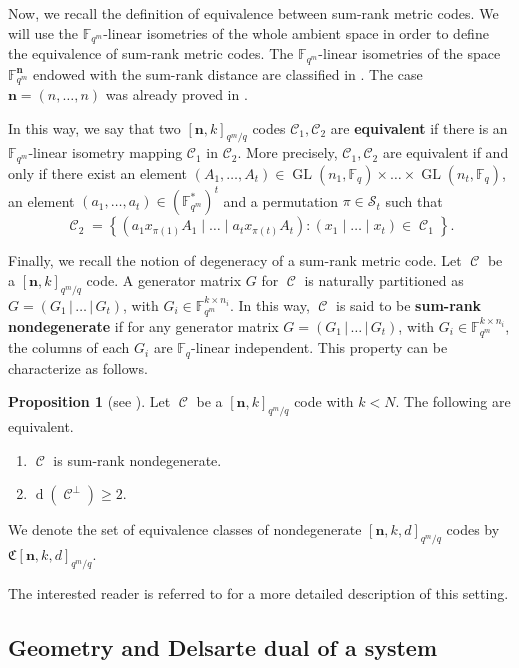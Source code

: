 \documentclass[11pt]{amsart}
\DeclareMathOperator{\C}{\mathcal{C}}
\DeclareMathOperator{\dd}{d}
\DeclareMathOperator{\GL}{GL}
\theoremstyle{definition}
\newtheorem{proposition}[theorem]{Proposition}
\newcommand{\cC}{{\mathcal C}}
\newcommand{\F}{{\mathbb F}}
\newcommand{\bfn}{\mathbf {n}}
\newcommand{\fq}{{\mathbb F}_{q}}
\newcommand{\Fq}{{\mathbb F}_{q}}
\newcommand{\Fm}{{\mathbb F}_{q^m}}
\newcommand{\Fmnk}{[\bfn,k]_{q^m/q}}
\newcommand{\Fmnkd}{[\bfn,k,d]_{q^m/q}}
\begin{document}
Now, we recall the definition of equivalence between sum-rank metric codes. We will use the $\Fm$-linear isometries of the whole ambient space in order to define the equivalence of sum-rank metric codes. The $\Fm$-linear isometries of the space $\F_{q^m}^\bfn$ endowed with the sum-rank distance are classified in \cite[Theorem 3.7]{alfarano2021sum}. The case $\bfn=(n,\ldots, n)$ was already proved in \cite[Theorem 2]{martinezpenas2021hamming}.

In this way, we say that two $\Fmnk$ codes $\cC_1, \cC_2$ are \textbf{equivalent} if there is an $\Fm$-linear isometry mapping $\cC_1$ in $ \cC_2$. More precisely, $\cC_1, \cC_2$ are equivalent if and only if there exist an element $(A_1,\ldots,A_t) \in \GL(n_1,\fq) \times \ldots \times \GL(n_t,\fq)$, an element $(a_1,\ldots,a_t) \in (\F_{q^m}^*)^t$ and a permutation $\pi \in \mathcal{S}_t$ such that
\[
\C_2=\left\{(a_1 x_{\pi(1)}A_1 \mid \ldots \mid a_tx_{\pi(t)}A_t) \colon (x_1\mid \ldots \mid x_t) \in \C_1\right\}.
\]




Finally, we recall the notion of degeneracy of a sum-rank metric code.
Let $\C$ be a $\Fmnk$ code. A generator matrix $G$ for $\C$ is naturally partitioned as $G=(G_1 \,|\, \ldots \,|\, G_t)$, with $G_i \in \Fm^{k \times n_i}$. In this way, $\C$ is said to be \textbf{sum-rank nondegenerate} if for any generator matrix $G=(G_1 \,|\, \ldots \,|\, G_t)$, with $G_i \in \Fm^{k \times n_i}$, the columns of each $G_i$ are $\Fq$-linear independent. This property can be characterize as follows.
\begin{proposition} [see \textnormal{\cite[Proposition 2.13]{neri2023geometry}}]\label{prop:charact_nondegenarate}
Let $\C$ be a $\Fmnk$ code with $k<N$. The following are equivalent.
\begin{enumerate}
    \item $\C$ is sum-rank nondegenerate.
    \item $\dd(\C^\perp) \geq 2$.
\end{enumerate}
\end{proposition}

 
We denote the set of equivalence classes of nondegenerate $\Fmnkd$ codes by $\mathfrak{C}\Fmnkd$. 


The interested reader is referred to \cite{Martinez2018skew,martinez2019theory,neri2022twisted,ott2021bounds} for a more detailed description of this setting.

\subsection{Geometry and Delsarte dual of a system}
\end{document}

